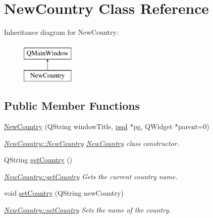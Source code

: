 \hypertarget{class_new_country}{}\section{New\+Country Class Reference}
\label{class_new_country}
Inheritance diagram for New\+Country\+:\begin{figure}[H]
\begin{center}
\leavevmode
\includegraphics[height=2.000000cm]{class_new_country}
\end{center}
\end{figure}
\subsection*{Public Member Functions}
\begin{DoxyCompactItemize}
\item 
\mbox{\hyperlink{class_new_country_a0ab1a95a2acd77e953f3a7aac8544880}{New\+Country}} (Q\+String window\+Title, \mbox{\hyperlink{classpsql}{psql}} $\ast$pg, Q\+Widget $\ast$parent=0)
\begin{DoxyCompactList}\small\item\em \mbox{\hyperlink{class_new_country_a0ab1a95a2acd77e953f3a7aac8544880}{New\+Country\+::\+New\+Country}} \mbox{\hyperlink{class_new_country}{New\+Country}} class constructor. \end{DoxyCompactList}\item 
Q\+String \mbox{\hyperlink{class_new_country_a5d28702b9788a1debf6817443d4a7355}{get\+Country}} ()
\begin{DoxyCompactList}\small\item\em \mbox{\hyperlink{class_new_country_a5d28702b9788a1debf6817443d4a7355}{New\+Country\+::get\+Country}} Gets the current country name. \end{DoxyCompactList}\item 
void \mbox{\hyperlink{class_new_country_af6fed97011d536e1a29db8112849e36b}{set\+Country}} (Q\+String new\+Country)
\begin{DoxyCompactList}\small\item\em \mbox{\hyperlink{class_new_country_af6fed97011d536e1a29db8112849e36b}{New\+Country\+::set\+Country}} Sets the name of the country. \end{DoxyCompactList}\end{DoxyCompactItemize}


